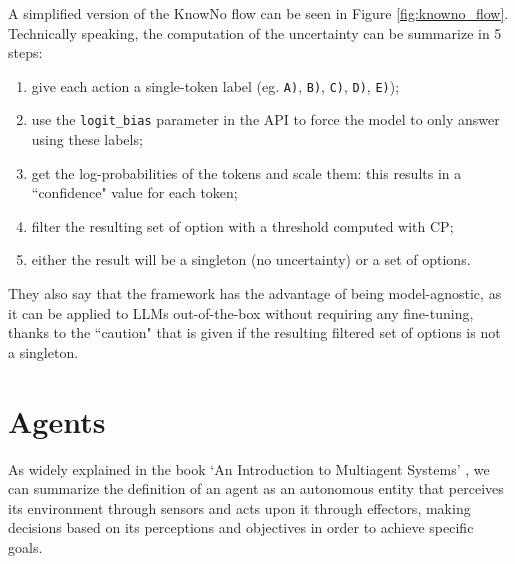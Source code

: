 A simplified version of the KnowNo flow can be seen in Figure \ref{fig:knowno_flow}.
Technically speaking, the computation of the uncertainty can be summarize in 5 steps:
\begin{enumerate}
  \item give each action a single-token label (eg. \texttt{A)}, \texttt{B)}, \texttt{C)},
    \texttt{D)}, \texttt{E)});

  \item use the \texttt{logit\_bias} parameter in the API to force the model to
    only answer using these labels;

  \item get the log-probabilities of the tokens and scale them: this results in
    a ``confidence" value for each token;

  \item filter the resulting set of option with a threshold computed with CP;

  \item either the result will be a singleton (no uncertainty) or a set of options.
\end{enumerate}

They also say that the framework has the advantage of being model-agnostic, as
it can be applied to LLMs out-of-the-box without requiring any fine-tuning, thanks
to the ``caution" that is given if the resulting filtered set of options is not
a singleton.

\section{Agents}
\label{sec:agents}


As widely explained in the book `An Introduction to Multiagent Systems'
\cite{wooldridge2002multiagent}, we can summarize the definition of an agent as an
autonomous entity that perceives its environment through sensors and acts upon it
through effectors, making decisions based on its perceptions and objectives in
order to achieve specific goals.

